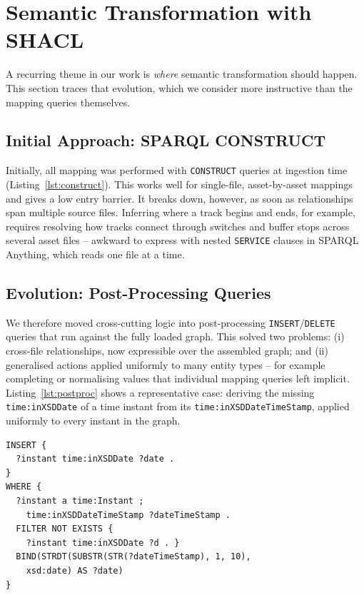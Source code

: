 \documentclass{ceurart}
\begin{document}
\section{Semantic Transformation with SHACL}
\label{sec:shacl}

A recurring theme in our work is \emph{where} semantic transformation should
happen. This section traces that evolution, which we consider more instructive
than the mapping queries themselves.

\subsection{Initial Approach: SPARQL CONSTRUCT}

Initially, all mapping was performed with \texttt{CONSTRUCT} queries at ingestion
time (Listing~\ref{lst:construct}). This works well for single-file,
asset-by-asset mappings and gives a low entry barrier. It breaks down, however,
as soon as relationships span multiple source files. Inferring where a track
begins and ends, for example, requires resolving how tracks connect through
switches and buffer stops across several asset files -- awkward to express with
nested \texttt{SERVICE} clauses in SPARQL Anything, which reads one file at a
time.

\subsection{Evolution: Post-Processing Queries}

We therefore moved cross-cutting logic into post-processing
\texttt{INSERT}/\texttt{DELETE} queries that run against the fully loaded graph.
This solved two problems: (i) cross-file relationships, now expressible over the
assembled graph; and (ii) generalised actions applied uniformly to many entity
types -- for example completing or normalising values that individual mapping
queries left implicit. Listing~\ref{lst:postproc} shows a representative case:
deriving the missing \texttt{time:inXSDDate} of a time instant from its
\texttt{time:inXSDDateTimeStamp}, applied uniformly to every instant in the
graph.

\begin{lstlisting}[language=sparql,caption={Representative post-processing: a
  generalised \texttt{INSERT} that completes the missing date on any
  \texttt{time:Instant} from its timestamp, applied uniformly across the whole
  graph.},label={lst:postproc}]
INSERT {
  ?instant time:inXSDDate ?date .
}
WHERE {
  ?instant a time:Instant ;
    time:inXSDDateTimeStamp ?dateTimeStamp .
  FILTER NOT EXISTS {
    ?instant time:inXSDDate ?d . }
  BIND(STRDT(SUBSTR(STR(?dateTimeStamp), 1, 10),
    xsd:date) AS ?date)
}
\end{lstlisting}
\end{document}
